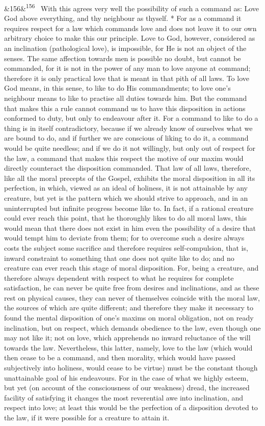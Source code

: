 \documentclass[12pt]{article}
\newcommand{\para}[1][]{\par\noindent\ifx&#1&\else\textsuperscript{\footnotesize #1}~\fi}
\begin{document}
\para[156] With this agrees very well the possibility of such a command as: Love God above everything, and thy neighbour as thyself. * For as a command it requires respect for a law which commands love and does not leave it to our own arbitrary choice to make this our principle. Love to God, however, considered as an inclination (pathological love), is impossible, for He is not an object of the senses. The same affection towards men is possible no doubt, but cannot be commanded, for it is not in the power of any man to love anyone at command; therefore it is only practical love that is meant in that pith of all laws. To love God means, in this sense, to like to do His commandments; to love one's neighbour means to like to practise all duties towards him. But the command that makes this a rule cannot command us to have this disposition in actions conformed to duty, but only to endeavour after it. For a command to like to do a thing is in itself contradictory, because if we already know of ourselves what we are bound to do, and if further we are conscious of liking to do it, a command would be quite needless; and if we do it not willingly, but only out of respect for the law, a command that makes this respect the motive of our maxim would directly counteract the disposition commanded. That law of all laws, therefore, like all the moral precepts of the Gospel, exhibits the moral disposition in all its perfection, in which, viewed as an ideal of holiness, it is not attainable by any creature, but yet is the pattern which we should strive to approach, and in an uninterrupted but infinite progress become like to. In fact, if a rational creature could ever reach this point, that he thoroughly likes to do all moral laws, this would mean that there does not exist in him even the possibility of a desire that would tempt him to deviate from them; for to overcome such a desire always costs the subject some sacrifice and therefore requires self-compulsion, that is, inward constraint to something that one does not quite like to do; and no creature can ever reach this stage of moral disposition. For, being a creature, and therefore always dependent with respect to what he requires for complete satisfaction, he can never be quite free from desires and inclinations, and as these rest on physical causes, they can never of themselves coincide with the moral law, the sources of which are quite different; and therefore they make it necessary to found the mental disposition of one's maxims on moral obligation, not on ready inclination, but on respect, which demands obedience to the law, even though one may not like it; not on love, which apprehends no inward reluctance of the will towards the law. Nevertheless, this latter, namely, love to the law (which would then cease to be a command, and then morality, which would have passed subjectively into holiness, would cease to be virtue) must be the constant though unattainable goal of his endeavours. For in the case of what we highly esteem, but yet (on account of the consciousness of our weakness) dread, the increased facility of satisfying it changes the most reverential awe into inclination, and respect into love; at least this would be the perfection of a disposition devoted to the law, if it were possible for a creature to attain it.
\end{document}
